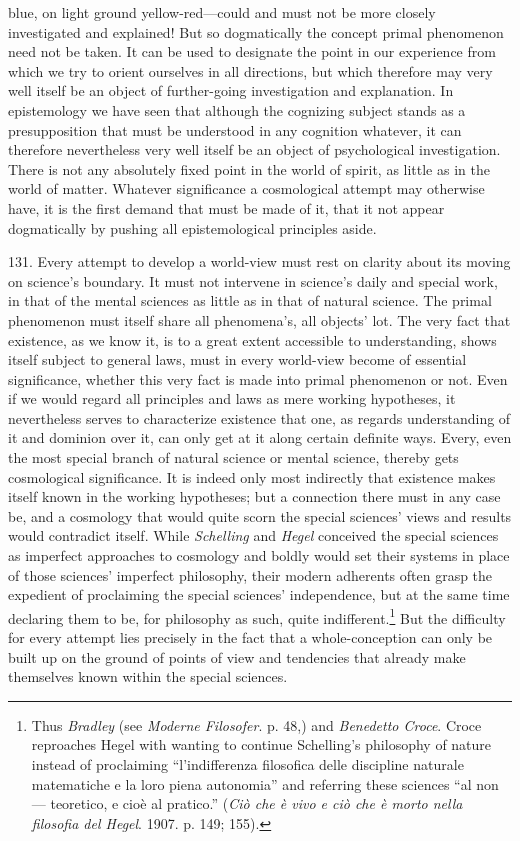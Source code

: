 \documentclass[12pt,a4paper]{book}
\newcommand{\opage}[1]{\marginnote{\footnotesize\textit{[#1]}}}
\begin{document}
blue, on light ground yellow-red---could and must not be more closely investigated and explained!
But so dogmatically the concept primal phenomenon need not be taken. It can be used to designate
the point in our experience from which we try to orient ourselves in all directions, but which
therefore may very well itself be an object of further-going investigation and explanation. In
epistemology we have seen that although the cognizing subject stands as a presupposition that
must be understood in any cognition whatever, it can therefore nevertheless very well itself be an
object of psychological investigation. There is not any absolutely fixed point in the world of
spirit, as little as in the world of matter. Whatever significance a cosmological attempt may
otherwise have, it is the first demand that must be made of it, that it not appear dogmatically by
pushing all epistemological principles aside.

131. Every attempt to develop a world-view must rest on clarity about its moving on science's
boundary. It must not intervene in science's daily and special work, in that of the mental sciences as little as in that of natural science. The primal phenomenon must itself share all phenomena's,
all objects' lot. The very fact that existence, as we know it, is to a great extent accessible to
understanding, shows itself subject to general laws, must in every world-view become of essential
significance, whether this very fact is made into primal phenomenon or not. Even if we \opage{313}would
regard all principles and laws as mere working hypotheses, it nevertheless serves to characterize
existence that one, as regards understanding of it and dominion over it, can only get at it along
certain definite ways. Every, even the most special branch of natural science or mental science,
thereby gets cosmological significance. It is indeed only most indirectly that existence makes
itself known in the working hypotheses; but a connection there must in any case be, and a
cosmology that would quite scorn the special sciences' views and results would contradict itself.
While \emph{Schelling} and \emph{Hegel} conceived the special sciences as imperfect approaches to
cosmology and boldly would set their systems in place of those sciences' imperfect philosophy,
their modern adherents often grasp the expedient of proclaiming the special sciences' independence,
but at the same time declaring them to be, for philosophy as such, quite
indifferent.\footnote{Thus \emph{Bradley} (see \emph{Moderne Filosofer}. p. 48,) and
\emph{Benedetto Croce}. Croce reproaches Hegel with wanting to continue Schelling's philosophy of
nature instead of proclaiming ``l'indifferenza filosofica delle discipline naturale matematiche e
la loro piena autonomia'' and referring these sciences ``al non --- teoretico, e cioè al pratico.''
(\emph{Ciò che è vivo e ciò che è morto nella filosofia del Hegel}. 1907. p. 149; 155).} But the
difficulty for every attempt lies precisely in the fact that a whole-conception can only be built
up on the ground of points of view and tendencies that already make themselves known within the
special sciences.
\end{document}
